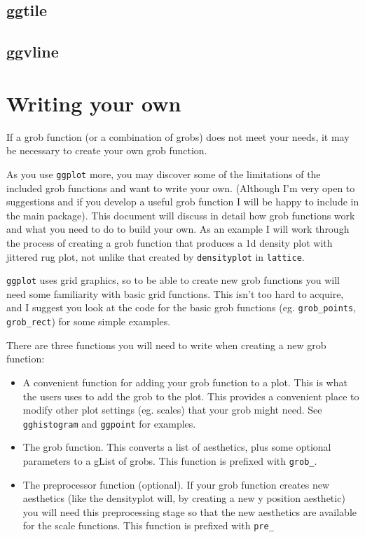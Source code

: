 \subsection{ggtile}\label{sub:ggtile}
\subsection{ggvline}\label{sub:ggvline}


\section{Writing your own}\label{sec:writing_your_own}

If a grob function (or a combination of grobs) does not meet your needs, it may be necessary to create your own grob function.  

As you use \texttt{ggplot} more, you may discover some of the limitations of the included grob functions and want to write your own.  (Although I'm very open to suggestions and if you develop a useful grob function I will be happy to include in the main package).  This document will discuss in detail how grob functions work and what you need to do to build your own.  As an example I will work through the process of creating a grob function that produces a 1d density plot with jittered rug plot, not unlike that created by \texttt{densityplot} in \texttt{lattice}.

\texttt{ggplot} uses grid graphics, so to be able to create new grob functions you will need some familiarity with basic grid functions.  This isn't too hard to acquire, and I suggest you look at the code for the basic grob functions (eg. \texttt{grob\_points}, \texttt{grob\_rect}) for some simple examples.

There are three functions you will need to write when creating a new grob function:

\begin{itemize}
	\item A convenient function for adding your grob function to a plot.  This is what the users uses to add the grob to the plot.  This provides a convenient place to modify other plot settings (eg. scales) that your grob might need.  See \texttt{gghistogram} and \texttt{ggpoint} for examples.
	\item The grob function.  This converts a list of aesthetics, plus some optional parameters to a gList of grobs.  This function is prefixed with \texttt{grob\_}.  
	\item The preprocessor function (optional).  If your grob function creates new aesthetics (like the densityplot will, by creating a new y position aesthetic) you will need this preprocessing stage so that the new aesthetics are available for the scale functions.  This function is prefixed with \texttt{pre\_}
\end{itemize}

